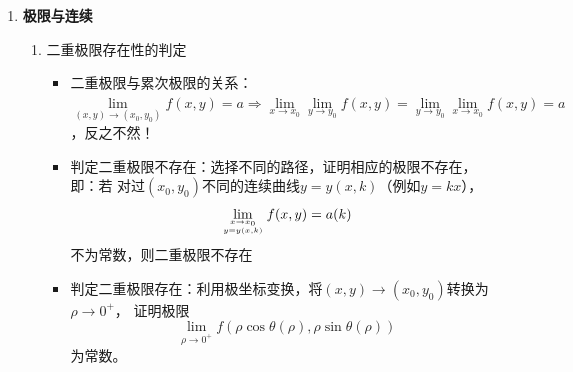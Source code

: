 \begin{enumerate}
  \item {\bf 极限与连续}
  \begin{enumerate}[(1)]
    \item 二重极限存在性的判定
    \begin{itemize}
      \item 二重极限与累次极限的关系：
      $\lim\limits_{(x,y)\to(x_0,y_0)}f(x,y)=a\Rightarrow
      \lim\limits_{x\to x_0}\lim\limits_{y\to y_0}f(x,y)=
      \lim\limits_{y\to y_0}\lim\limits_{x\to x_0}f(x,y)=a$，反之不然！
      \item 判定二重极限不存在：选择不同的路径，证明相应的极限不存在，即：若
      对过$(x_0,y_0)$不同的连续曲线$y=y(x,k)$（例如$y=kx$），
      $$\lim\limits_{x\to x_0\atop y=y(x,k)}f(x,y)=a(k)$$
      不为常数，则二重极限不存在
      \item 判定二重极限存在：利用极坐标变换，将$(x,y)\to(x_0,y_0)$转换为$\rho\to0^+$，
      证明极限
      $$\lim\limits_{\rho\to0^+}f(\rho\cos\theta(\rho),\rho\sin\theta(\rho))$$
      为常数。
      

\end{itemize}
\end{enumerate}
\end{enumerate}
